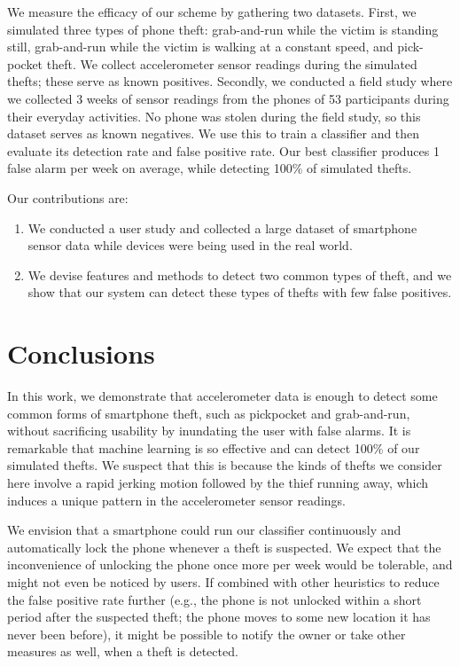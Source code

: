 We measure the efficacy of our scheme by gathering two datasets.
First, we simulated three types of phone theft: grab-and-run while the victim is standing still, grab-and-run while the victim is walking at a constant speed, and pick-pocket theft.
We collect accelerometer sensor readings during the simulated thefts; these serve as known positives.
Secondly, we conducted a field study where we collected 3 weeks of sensor readings from the phones of 53 participants during their everyday activities.
No phone was stolen during the field study, so this dataset serves as known negatives.
We use this to train a classifier and then evaluate its detection rate and false positive rate.
Our best classifier produces 1 false alarm per week on average, while detecting 100\% of simulated thefts.

Our contributions are:
\begin{enumerate}
  \item We conducted a user study and collected a large dataset of smartphone sensor data while devices were being used in the real world.
  \item We devise features and methods to detect two common types of theft, and we show that our system can detect these types of thefts with few false positives.
\end{enumerate}





\section{Conclusions}

In this work, we demonstrate that accelerometer data is enough to detect some common forms of smartphone theft, such as pickpocket and grab-and-run, without sacrificing usability by inundating the user with false alarms.
It is remarkable that machine learning is so effective and can detect 100\% of our simulated thefts.
We suspect that this is because the kinds of thefts we consider here involve a rapid jerking motion followed by the thief running away, which induces a unique pattern in the accelerometer sensor readings.

We envision that a smartphone could run our classifier continuously and automatically lock the phone whenever a theft is suspected.
We expect that the inconvenience of unlocking the phone once more per week would be tolerable, and might not even be noticed by users.
If combined with other heuristics to reduce the false positive rate further (e.g., the phone is not unlocked within a short period after the suspected theft; the phone moves to some new location it has never been before), it might be possible to notify the owner or take other measures as well, when a theft is detected.

